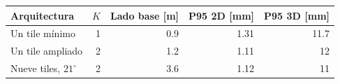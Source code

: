\begin{tabular}{lrrrr}\toprule
Arquitectura & $K$ & Lado base [m] & P95 2D [mm] & P95 3D [mm]\\\midrule
Un tile mínimo & 1 & 0.9 & 1.31 & 11.7 \\
Un tile ampliado & 2 & 1.2 & 1.11 & 12 \\
Nueve tiles, $21^\circ$ & 2 & 3.6 & 1.12 & 11 \\
\bottomrule\end{tabular}
